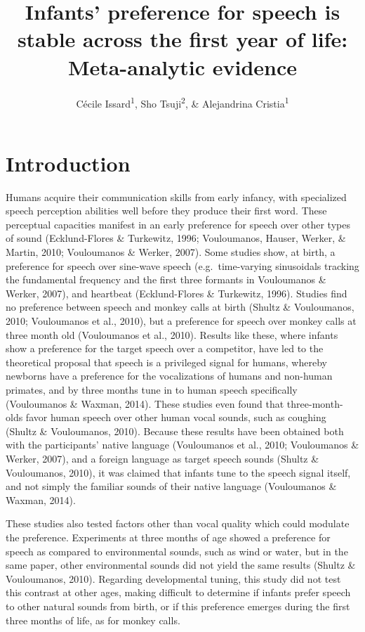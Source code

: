 \documentclass[
  man,mask,floatsintext]{apa6}
\title{Infants' preference for speech is stable across the first year of life: Meta-analytic evidence}
\author{Cécile Issard\textsuperscript{1}, Sho Tsuji\textsuperscript{2}, \& Alejandrina Cristia\textsuperscript{1}}
\date{}
\affiliation{\vspace{0.5cm}\textsuperscript{1} Laboratoire de Sciences Cognitives et Psycholinguistique, École Normale Superieure, Département d'Études Cognitives\\\textsuperscript{2} International Research Center for Neurointelligence, The University of Tokyo}
\begin{document}
\maketitle

\hypertarget{introduction}{%
\section{Introduction}\label{introduction}}

Humans acquire their communication skills from early infancy, with specialized speech perception abilities well before they produce their first word. These perceptual capacities manifest in an early preference for speech over other types of sound (Ecklund-Flores \& Turkewitz, 1996; Vouloumanos, Hauser, Werker, \& Martin, 2010; Vouloumanos \& Werker, 2007). Some studies show, at birth, a preference for speech over sine-wave speech (e.g.~time-varying sinusoidals tracking the fundamental frequency and the first three formants in Vouloumanos \& Werker, 2007), and heartbeat (Ecklund-Flores \& Turkewitz, 1996). Studies find no preference between speech and monkey calls at birth (Shultz \& Vouloumanos, 2010; Vouloumanos et al., 2010), but a preference for speech over monkey calls at three month old (Vouloumanos et al., 2010). Results like these, where infants show a preference for the target speech over a competitor, have led to the theoretical proposal that speech is a privileged signal for humans, whereby newborns have a preference for the vocalizations of humans and non-human primates, and by three months tune in to human speech specifically (Vouloumanos \& Waxman, 2014). These studies even found that three-month-olds favor human speech over other human vocal sounds, such as coughing (Shultz \& Vouloumanos, 2010). Because these results have been obtained both with the participants' native language (Vouloumanos et al., 2010; Vouloumanos \& Werker, 2007), and a foreign language as target speech sounds (Shultz \& Vouloumanos, 2010), it was claimed that infants tune to the speech signal itself, and not simply the familiar sounds of their native language (Vouloumanos \& Waxman, 2014).

These studies also tested factors other than vocal quality which could modulate the preference. Experiments at three months of age showed a preference for speech as compared to environmental sounds, such as wind or water, but in the same paper, other environmental sounds did not yield the same results (Shultz \& Vouloumanos, 2010). Regarding developmental tuning, this study did not test this contrast at other ages, making difficult to determine if infants prefer speech to other natural sounds from birth, or if this preference emerges during the first three months of life, as for monkey calls.
\end{document}
